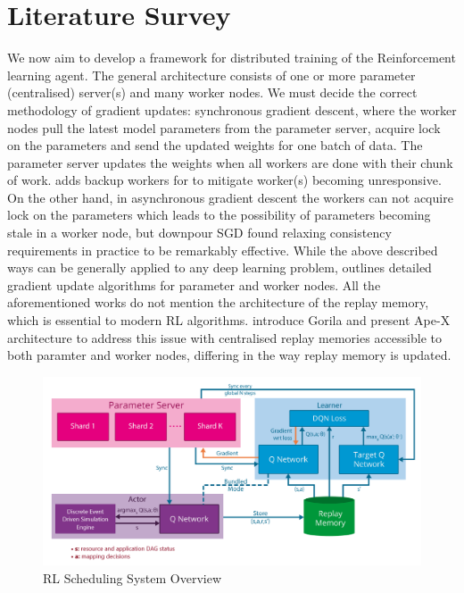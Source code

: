 \documentclass[10pt,a4paper]{article}
\begin{document}
\section{Literature Survey}
\begin{normalsize}
We now aim to develop a framework for distributed training of the Reinforcement learning agent. The general architecture consists of one or more parameter (centralised) server(s) and many worker nodes. We must decide the correct methodology of gradient updates: synchronous gradient descent, where the worker nodes pull the latest model parameters from the parameter server, acquire lock on the parameters and send the updated weights for one batch of data. The parameter server updates the weights when all workers are done with their chunk of work. \citep{chen2016revisiting} adds backup workers for to mitigate worker(s) becoming unresponsive.  On the other hand, in asynchronous gradient descent the workers can not acquire lock on the parameters which leads to the possibility of parameters becoming stale in a worker node, but downpour SGD \citep{dean2012large} found relaxing consistency requirements in practice to be remarkably effective. While the above described ways can be generally applied to any deep learning problem, \citep {ong2015distributed} outlines detailed gradient update algorithms for parameter and worker nodes. All the aforementioned works do not mention the architecture of the replay memory, which is essential to modern RL algorithms. \citep{nair2015massively} introduce Gorila and \citep{horgan2018distributed} present Ape-X architecture to address this issue with centralised replay memories accessible to both paramter and worker nodes, differing in the way replay memory is updated.

\end{normalsize}

\begin{figure}[b!]
  \includegraphics[width=500pt]{gorila_img.PNG}
  \caption{RL Scheduling System Overview}
\end{figure}
\end{document}
